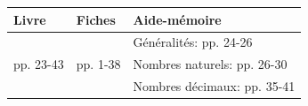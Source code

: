 

\def\arraystretch{1.2}
\begin{tabularx}{\linewidth}{|>{\centering\arraybackslash}p{3cm}|>{\centering\arraybackslash}p{3cm}|X|}
\hline
\cellcolor{themeNO!30} Livre & \cellcolor{themeNO!30} Fiches & \cellcolor{themeNO!30} \hfill Aide-mémoire\hfill\null\\
\hline
&&Généralités: pp. 24-26\\
pp. 23-43&pp. 1-38&Nombres naturels: pp. 26-30\\
&&Nombres décimaux: pp. 35-41\\
\hline
\end{tabularx}
\def\arraystretch{1}

